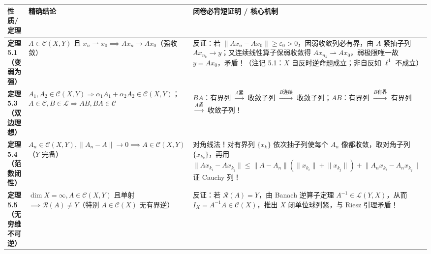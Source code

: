\documentclass[11pt,a4paper]{article}
\newcounter{none}
\begin{document}
{\def\LTcaptype{none} %
{\small\renewcommand{\arraystretch}{1.38}\setlength{\tabcolsep}{5pt}
\begin{longtable}[]{@{}
  >{\raggedright\arraybackslash}p{}
  >{\raggedright\arraybackslash}p{}
  >{\raggedright\arraybackslash}p{}@{}}
\toprule\noalign{}
\rowcolor{AccentSoft}
\begin{minipage}[b]{\linewidth}\raggedright
性质/定理
\end{minipage} & \begin{minipage}[b]{\linewidth}\raggedright
精确结论
\end{minipage} & \begin{minipage}[b]{\linewidth}\raggedright
闭卷必背短证明 / 核心机制
\end{minipage} \\
\midrule\noalign{}
\endhead
\bottomrule\noalign{}
\endlastfoot
\textbf{定理 5.1（变弱为强）} & \(A \in \mathcal{C}(X, Y)\) 且 \(x_n \rightharpoonup x_0 \implies Ax_n \to Ax_0\)（强收敛） & 反证：若 \(\lVert Ax_n - Ax_0\rVert \ge \varepsilon_0 > 0\)，因弱收敛列必有界，由 \(A\) 紧抽子列 \(Ax_{n_k} \to y\)；又连续线性算子保弱收敛得 \(Ax_{n_k} \rightharpoonup Ax_0\)，弱极限唯一故 \(y = Ax_0\)，矛盾！（注记 5.1：\(X\) 自反时逆命题成立；非自反如 \(\ell^1\) 不成立） \\
\textbf{定理 5.3（双边理想）} & \(A_1, A_2 \in \mathcal{C}(X, Y) \Rightarrow \alpha_1 A_1 + \alpha_2 A_2 \in \mathcal{C}(X, Y)\)；\(A \in \mathcal{C}, B \in \mathcal{L} \Rightarrow AB, BA \in \mathcal{C}\) & \(BA\)：有界列 \(\xrightarrow{A\text{紧}}\) 收敛子列 \(\xrightarrow{B\text{连续}}\) 收敛子列；\(AB\)：有界列 \(\xrightarrow{B\text{有界}}\) 有界列 \(\xrightarrow{A\text{紧}}\) 收敛子列！ \\
\textbf{定理 5.4（范数闭性）} & \(A_n \in \mathcal{C}(X, Y), \lVert A_n - A\rVert \to 0 \implies A \in \mathcal{C}(X, Y)\)（\(Y\) 完备） & 对角线法！对有界列 \(\{x_k\}\) 依次抽子列使每个 \(A_n\) 像都收敛，取对角子列 \(\{x_{k_k}\}\)，再用 \(\lVert Ax_{k_i} - Ax_{k_j}\rVert \le \lVert A - A_n\rVert(\lVert x_{k_i}\rVert+\lVert x_{k_j}\rVert) + \lVert A_n x_{k_i} - A_n x_{k_j}\rVert\) 证 Cauchy 列！ \\
\textbf{定理 5.5（无穷维不可逆）} & \(\dim X = \infty, A \in \mathcal{C}(X, Y)\) 且单射 \(\implies \mathcal{R}(A) \neq Y\)（特别 \(A \in \mathcal{C}(X)\) 无有界逆） & 反证：若 \(\mathcal{R}(A) = Y\)，由 Banach 逆算子定理 \(A^{-1} \in \mathcal{L}(Y, X)\)，从而 \(I_X = A^{-1}A \in \mathcal{C}(X)\)，推出 \(X\) 闭单位球列紧，与 Riesz 引理矛盾！ \\

\end{longtable}}}
\end{document}

